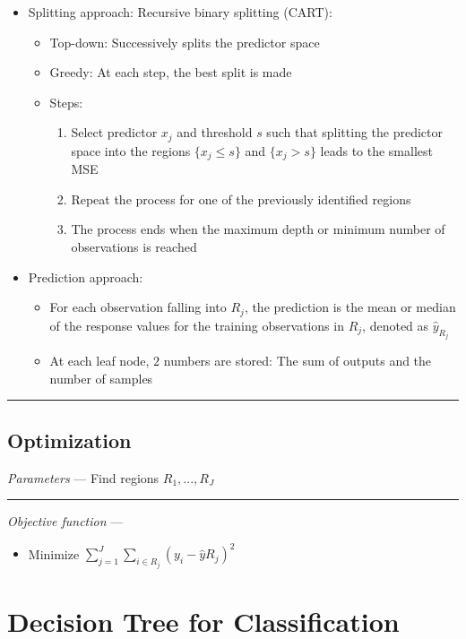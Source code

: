\begin{itemize}
    \item Splitting approach: Recursive binary splitting (CART):
    \begin{itemize}
        \item Top-down: Successively splits the predictor space
        \item Greedy: At each step, the best split is made
        \item Steps:
        \begin{enumerate}
            \item Select predictor $x_j$ and threshold $s$ such that splitting the predictor space into the regions $\{x_j \leq s\}$ and $\{x_j > s\}$ leads to the smallest MSE
            \item Repeat the process for one of the previously identified regions
            \item The process ends when the maximum depth or minimum number of observations is reached
        \end{enumerate}
    \end{itemize}
    \item Prediction approach:
    \begin{itemize}
        \item For each observation falling into $R_j$, the prediction is the mean or median of the response values for the training observations in $R_j$, denoted as $\hat{y}_{R_j}$
        \item At each leaf node, $2$ numbers are stored: The sum of outputs and the number of samples
    \end{itemize}
\end{itemize}

{\color{black}\hrule height 0.001mm}

\subsection*{Optimization}
\emph{Parameters} --- Find regions $R_1, ..., R_J$

{\color{lightgray}\hrule height 0.001mm}

\emph{Objective function} --- 
\begin{itemize}
    \item Minimize $\sum_{j=1}^J \sum_{i \in R_j} (y_i - \hat{y}R_j)^2$
\end{itemize}

\section{Decision Tree for Classification}
